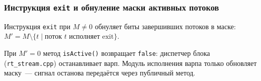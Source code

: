 \subsubsection{Инструкция \texttt{exit} и обнуление маски активных потоков}

Инструкция \texttt{exit} при $M \neq 0$ обнуляет биты завершивших
потоков в маске:
$M' = M \setminus \{t \mid \text{поток } t \text{ исполняет exit}\}$.

\begin{sloppypar}
При $M' = 0$ метод \texttt{isActive()} возвращает \texttt{false}:
диспетчер блока (\texttt{rt\_stream.cpp}) останавливает варп. Модуль исполнения варпа только обновляет
маску~--- сигнал останова передаётся через публичный метод.
\end{sloppypar}

\newpage
